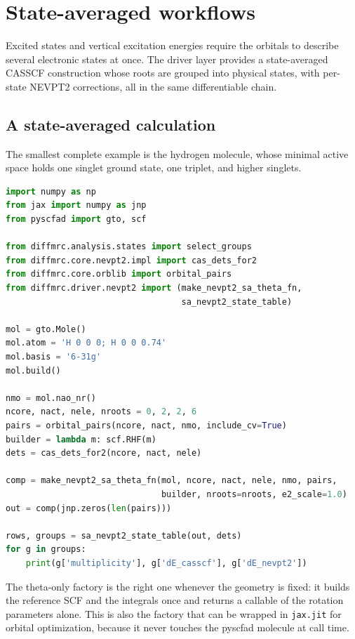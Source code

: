 \section{State-averaged workflows}
\label{sec:state-averaged}

Excited states and vertical excitation energies require the orbitals
to describe several electronic states at once.  The driver layer
provides a state-averaged CASSCF construction whose roots are grouped
into physical states, with per-state NEVPT2 corrections, all in the
same differentiable chain.

\subsection{A state-averaged calculation}

The smallest complete example is the hydrogen molecule, whose minimal
active space holds one singlet ground state, one triplet, and higher
singlets.

\begin{lstlisting}[language=Python]
import numpy as np
from jax import numpy as jnp
from pyscfad import gto, scf

from diffmrc.analysis.states import select_groups
from diffmrc.core.nevpt2.impl import cas_dets_for2
from diffmrc.core.orblib import orbital_pairs
from diffmrc.driver.nevpt2 import (make_nevpt2_sa_theta_fn,
                                   sa_nevpt2_state_table)

mol = gto.Mole()
mol.atom = 'H 0 0 0; H 0 0 0.74'
mol.basis = '6-31g'
mol.build()

nmo = mol.nao_nr()
ncore, nact, nele, nroots = 0, 2, 2, 6
pairs = orbital_pairs(ncore, nact, nmo, include_cv=True)
builder = lambda m: scf.RHF(m)
dets = cas_dets_for2(ncore, nact, nele)

comp = make_nevpt2_sa_theta_fn(mol, ncore, nact, nele, nmo, pairs,
                               builder, nroots=nroots, e2_scale=1.0)
out = comp(jnp.zeros(len(pairs)))

rows, groups = sa_nevpt2_state_table(out, dets)
for g in groups:
    print(g['multiplicity'], g['dE_casscf'], g['dE_nevpt2'])
\end{lstlisting}

The theta-only factory is the right one whenever the geometry is
fixed: it builds the reference SCF and the integrals once and returns
a callable of the rotation parameters alone.  This is also the factory
that can be wrapped in \texttt{jax.jit} for orbital optimization,
because it never touches the pyscfad molecule at call time.


